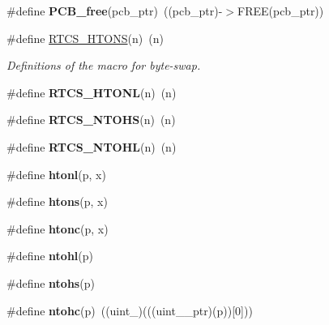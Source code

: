\begin{DoxyCompactItemize}
\item 
\#define {\bfseries P\+C\+B\+\_\+free}(pcb\+\_\+ptr)~((pcb\+\_\+ptr)-\/$>$F\+R\+EE(pcb\+\_\+ptr))\hypertarget{group__enet__rtcs__adaptor_ga69b9edd45f4cfbc7e70de072464cc8f7}{}\label{group__enet__rtcs__adaptor_ga69b9edd45f4cfbc7e70de072464cc8f7}

\item 
\#define \hyperlink{group__enet__rtcs__adaptor_gadc39cb905e1df34734a901094ebd3b1e}{R\+T\+C\+S\+\_\+\+H\+T\+O\+NS}(n)~(n)\hypertarget{group__enet__rtcs__adaptor_gadc39cb905e1df34734a901094ebd3b1e}{}\label{group__enet__rtcs__adaptor_gadc39cb905e1df34734a901094ebd3b1e}

\begin{DoxyCompactList}\small\item\em Definitions of the macro for byte-\/swap. \end{DoxyCompactList}\item 
\#define {\bfseries R\+T\+C\+S\+\_\+\+H\+T\+O\+NL}(n)~(n)\hypertarget{group__enet__rtcs__adaptor_gad3390ecf3e90826fa71b504117c37ac5}{}\label{group__enet__rtcs__adaptor_gad3390ecf3e90826fa71b504117c37ac5}

\item 
\#define {\bfseries R\+T\+C\+S\+\_\+\+N\+T\+O\+HS}(n)~(n)\hypertarget{group__enet__rtcs__adaptor_ga9c76c91e56f4ad0459157c99cb6c33ed}{}\label{group__enet__rtcs__adaptor_ga9c76c91e56f4ad0459157c99cb6c33ed}

\item 
\#define {\bfseries R\+T\+C\+S\+\_\+\+N\+T\+O\+HL}(n)~(n)\hypertarget{group__enet__rtcs__adaptor_ga0b6892f7d9be2b274b8627edcc27af04}{}\label{group__enet__rtcs__adaptor_ga0b6892f7d9be2b274b8627edcc27af04}

\item 
\#define {\bfseries htonl}(p,  x)
\item 
\#define {\bfseries htons}(p,  x)
\item 
\#define {\bfseries htonc}(p,  x)
\item 
\#define {\bfseries ntohl}(p)
\item 
\#define {\bfseries ntohs}(p)
\item 
\#define {\bfseries ntohc}(p)~((uint\+\_)(((uint\+\_\+\_\+ptr)(p))\mbox{[}0\mbox{]}))\hypertarget{group__enet__rtcs__adaptor_ga0e0f252215cc31a63f671c47bf235ed9}{}\label{group__enet__rtcs__adaptor_ga0e0f252215cc31a63f671c47bf235ed9}


\end{DoxyCompactItemize}
